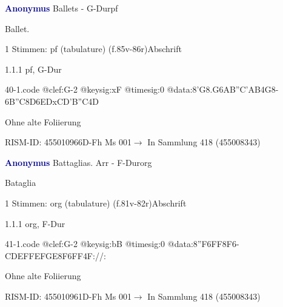 \documentclass[twocolumn, 12pt]{book}
\begin{document}
\par \vspace{16pt} \textcolor{darkblue}{\textbf{Anonymus  }}\hfillplus{\textbf{[40]}}\newline Ballets - G-Dur\newline pf
\par \begin{itshape}[f.85v, at left:] Ballet.\end{itshape} 
\par \textcolor{darkblue}{}  1 Stimmen: pf (tabulature)  (f.85v-86r)\newline Abschrift
\par 1.1.1  pf, G-Dur  
\begin{filecontents*}{40-1.code}
@clef:G-2
@keysig:xF
@timesig:0
@data:8'G{8.G6A}{B''C'AB}4G8-{6B''C}{8D6ED}{xCD'B''C}4D
\end{filecontents*}
\newline %
\par Ohne alte Foliierung
\par RISM-ID: 455010966\newline D-Fh  Ms 001\newline $\rightarrow$ In Sammlung 418 (455008343)
      
\par \vspace{16pt} \textcolor{darkblue}{\textbf{Anonymus  }}\hfillplus{\textbf{[41]}}\newline Battaglias. Arr - F-Dur\newline org
\par \begin{itshape}[f.81v, at left:] Bataglia\end{itshape} 
\par \textcolor{darkblue}{}  1 Stimmen: org (tabulature)  (f.81v-82r)\newline Abschrift
\par 1.1.1  org, F-Dur  
\begin{filecontents*}{41-1.code}
@clef:G-2
@keysig:bB
@timesig:0
@data:{8''F6FF}8F6-C{DEFF}{EFGE}{8F6FF}4F://:
\end{filecontents*}
\newline %
\par Ohne alte Foliierung
\par RISM-ID: 455010961\newline D-Fh  Ms 001\newline $\rightarrow$ In Sammlung 418 (455008343)
      
\end{document}

